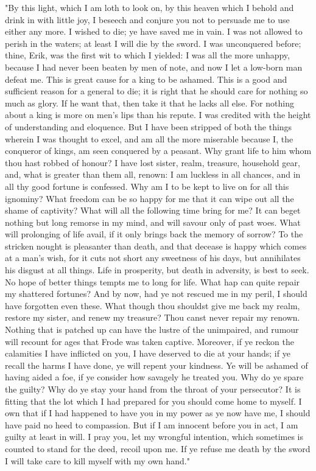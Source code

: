 \documentclass[10pt,a4paper]{report}
\begin{document}
"By this light, which I am loth to look on, by this heaven which I behold and drink in with little joy, I beseech and conjure you not to persuade me to use either any more. I wished to die; ye have saved me in vain. I was not allowed to perish in the waters; at least I will die by the sword. I was unconquered before; thine, Erik, was the first wit to which I yielded: I was all the more unhappy, because I had never been beaten by men of note, and now I let a low-born man defeat me. This is great cause for a king to be ashamed. This is a good and sufficient reason for a general to die; it is right that he should care for nothing so much as glory. If he want that, then take it that he lacks all else. For nothing about a king is more on men's lips than his repute. I was credited with the height of understanding and eloquence. But I have been stripped of both the things wherein I was thought to excel, and am all the more miserable because I, the conqueror of kings, am seen conquered by a peasant. Why grant life to him whom thou hast robbed of honour? I have lost sister, realm, treasure, household gear, and, what is greater than them all, renown: I am luckless in all chances, and in all thy good fortune is confessed. Why am I to be kept to live on for all this ignominy? What freedom can be so happy for me that it can wipe out all the shame of captivity? What will all the following time bring for me? It can beget nothing but long remorse in my mind, and will savour only of past woes. What will prolonging of life avail, if it only brings back the memory of sorrow? To the stricken nought is pleasanter than death, and that decease is happy which comes at a man's wish, for it cuts not short any sweetness of his days, but annihilates his disgust at all things. Life in prosperity, but death in adversity, is best to seek. No hope of better things tempts me to long for life. What hap can quite repair my shattered fortunes? And by now, had ye not rescued me in my peril, I should have forgotten even these. What though thou shouldst give me back my realm, restore my sister, and renew my treasure? Thou canst never repair my renown. Nothing that is patched up can have the lustre of the unimpaired, and rumour will recount for ages that Frode was taken captive. Moreover, if ye reckon the calamities I have inflicted on you, I have deserved to die at your hands; if ye recall the harms I have done, ye will repent your kindness. Ye will be ashamed of having aided a foe, if ye consider how savagely he treated you. Why do ye spare the guilty? Why do ye stay your hand from the throat of your persecutor? It is fitting that the lot which I had prepared for you should come home to myself. I own that if I had happened to have you in my power as ye now have me, I should have paid no heed to compassion. But if I am innocent before you in act, I am guilty at least in will. I pray you, let my wrongful intention, which sometimes is counted to stand for the deed, recoil upon me. If ye refuse me death by the sword I will take care to kill myself with my own hand."\\
\end{document}
